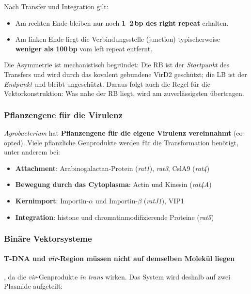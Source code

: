 Nach Transfer und Integration gilt:
\begin{itemize}
    \item Am rechten Ende bleiben nur noch \textbf{1--2\,bp des right repeat}
    erhalten.
    \item Am linken Ende liegt die Verbindungsstelle (junction) typischerweise
    \textbf{weniger als 100\,bp} vom left repeat entfernt.
\end{itemize}

\begin{bem}
    Die Asymmetrie ist mechanistisch begründet: Die RB ist der \emph{Startpunkt}
    des Transfers und wird durch das kovalent gebundene VirD2 geschützt; die LB ist
    der \emph{Endpunkt} und bleibt ungeschützt.
    Daraus folgt auch die Regel für die
    Vektorkonstruktion: Was nahe der RB liegt, wird am zuverlässigsten übertragen.
\end{bem}

\subsubsection{Pflanzengene für die Virulenz}\label{subsubsec:pflanzengene-fur-die-virulenz}
\emph{Agrobacterium} hat \textbf{Pflanzengene für die eigene Virulenz
vereinnahmt} (co-opted).
Viele pflanzliche Genprodukte werden für die
Transformation benötigt, unter anderem bei:
\begin{itemize}
    \item \textbf{Attachment}: Arabinogalactan-Protein (\emph{rat1}),
    \emph{rat3}, CslA9 (\emph{rat4})
    \item \textbf{Bewegung durch das Cytoplasma}: Actin und Kinesin
    (\emph{rat4A})
    \item \textbf{Kernimport}: Importin-$\alpha$ und Importin-$\beta$
    (\emph{ratJ1}), VIP1
    \item \textbf{Integration}: \gls{histon}e und chromatinmodifizierende Proteine
    (\emph{rat5})
\end{itemize}

\subsubsection{Binäre Vektorsysteme}
\paragraph{T-DNA und \emph{vir}-Region müssen
nicht auf demselben Molekül liegen}, da die \emph{vir}-Genprodukte
\emph{in trans} wirken.
Das System wird deshalb auf zwei Plasmide aufgeteilt:


